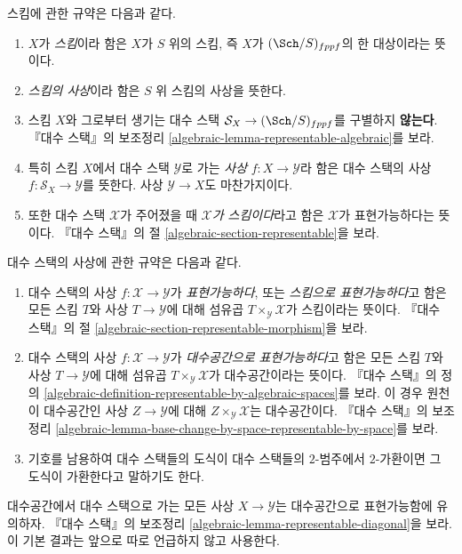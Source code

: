 스킴에 관한 규약은 다음과 같다.
\begin{enumerate}
\item $X$가 {\it 스킴}이라 함은 $X$가 $S$ 위의 스킴,
즉 $X$가 $(\Sch/S)_{fppf}$의 한 대상이라는 뜻이다.
\item {\it 스킴의 사상}이라 함은 $S$ 위 스킴의 사상을 뜻한다.
\item 스킴 $X$와 그로부터 생기는 대수 스택
$\mathcal{S}_X \to (\Sch/S)_{fppf}$를 구별하지 {\bf 않는다}.
『대수 스택』의 보조정리
\ref{algebraic-lemma-representable-algebraic}를 보라.
\item 특히 스킴 $X$에서 대수 스택 $\mathcal{Y}$로 가는 {\it 사상}
$f : X \to \mathcal{Y}$라 함은 대수 스택의 사상
$f : \mathcal{S}_X \to \mathcal{Y}$를 뜻한다.
사상 $\mathcal{Y} \to X$도 마찬가지이다.
\item 또한 대수 스택 $\mathcal{X}$가 주어졌을 때
{\it $\mathcal{X}$가 스킴이다}라고 함은 $\mathcal{X}$가
표현가능하다는 뜻이다. 『대수 스택』의 절
\ref{algebraic-section-representable}을 보라.
\end{enumerate}
대수 스택의 사상에 관한 규약은 다음과 같다.
\begin{enumerate}
\item 대수 스택의 사상 $f : \mathcal{X} \to \mathcal{Y}$가
{\it 표현가능하다}, 또는 {\it 스킴으로 표현가능하다}고 함은
모든 스킴 $T$와 사상 $T \to \mathcal{Y}$에 대해 섬유곱
$T \times_\mathcal{Y} \mathcal{X}$가 스킴이라는 뜻이다.
『대수 스택』의 절
\ref{algebraic-section-representable-morphism}을 보라.
\item 대수 스택의 사상 $f : \mathcal{X} \to \mathcal{Y}$가
{\it 대수공간으로 표현가능하다}고 함은 모든 스킴 $T$와 사상
$T \to \mathcal{Y}$에 대해 섬유곱
$T \times_\mathcal{Y} \mathcal{X}$가 대수공간이라는 뜻이다.
『대수 스택』의 정의
\ref{algebraic-definition-representable-by-algebraic-spaces}를 보라.
이 경우 원천이 대수공간인 사상 $Z \to \mathcal{Y}$에 대해
$Z \times_\mathcal{Y} \mathcal{X}$는 대수공간이다.
『대수 스택』의 보조정리
\ref{algebraic-lemma-base-change-by-space-representable-by-space}를 보라.
\item 기호를 남용하여 대수 스택들의 도식이 대수 스택들의 $2$-범주에서
$2$-가환이면 그 도식이 가환한다고 말하기도 한다.
\end{enumerate}
대수공간에서 대수 스택으로 가는 모든 사상 $X \to \mathcal{Y}$는
대수공간으로 표현가능함에 유의하자. 『대수 스택』의 보조정리
\ref{algebraic-lemma-representable-diagonal}을 보라.
이 기본 결과는 앞으로 따로 언급하지 않고 사용한다.




